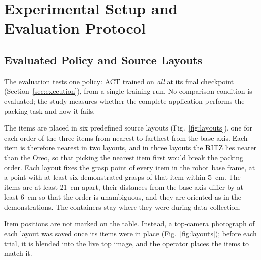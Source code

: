 \section{Experimental Setup and Evaluation Protocol}
\label{sec:experiments}

\subsection{Evaluated Policy and Source Layouts}
\label{sec:layouts}
The evaluation tests one policy: ACT trained on \emph{all} at its final checkpoint
(Section~\ref{sec:execution}), from a single training run. No comparison
condition is evaluated; the study measures whether the complete application
performs the packing task and how it fails.

The items are placed in six predefined source layouts
(Fig.~\ref{fig:layouts}), one for each order of the three items from nearest
to farthest from the base axis. Each item is therefore nearest in two layouts,
and in three layouts the RITZ lies nearer than the Oreo, so that picking the
nearest item first would break the packing order. Each layout fixes the grasp
point of every item in the robot base frame, at a point with at least six
demonstrated grasps of that item within 5~cm. The items are at least 21~cm
apart, their distances from the base axis differ by at least 6~cm so that the
order is unambiguous, and they are oriented as in the demonstrations. The
containers stay where they were during data collection.

Item positions are not marked on the table. Instead, a top-camera photograph
of each layout was saved once its items were in place (Fig.~\ref{fig:layouts});
before each trial, it is blended into the live top image, and the operator
places the items to match it.

